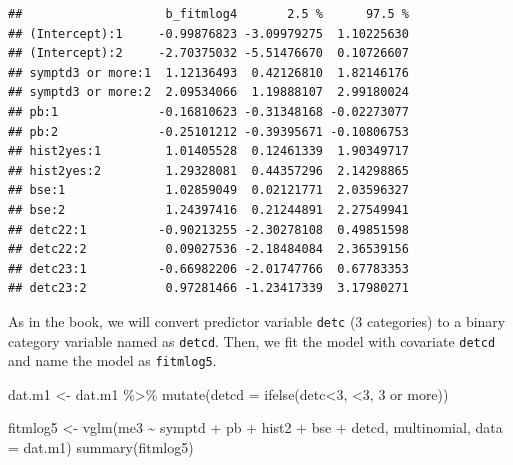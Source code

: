 \documentclass[
  10pt,
]{krantz}
\newenvironment{Shaded}{\begin{snugshade}}{\end{snugshade}}
\newcommand{\AttributeTok}[1]{\textcolor[rgb]{0.77,0.63,0.00}{#1}}
\newcommand{\DecValTok}[1]{\textcolor[rgb]{0.00,0.00,0.81}{#1}}
\newcommand{\FunctionTok}[1]{\textcolor[rgb]{0.00,0.00,0.00}{#1}}
\newcommand{\NormalTok}[1]{#1}
\newcommand{\OtherTok}[1]{\textcolor[rgb]{0.56,0.35,0.01}{#1}}
\newcommand{\SpecialCharTok}[1]{\textcolor[rgb]{0.00,0.00,0.00}{#1}}
\newcommand{\StringTok}[1]{\textcolor[rgb]{0.31,0.60,0.02}{#1}}
\begin{document}
\begin{verbatim}
##                    b_fitmlog4       2.5 %      97.5 %
## (Intercept):1     -0.99876823 -3.09979275  1.10225630
## (Intercept):2     -2.70375032 -5.51476670  0.10726607
## symptd3 or more:1  1.12136493  0.42126810  1.82146176
## symptd3 or more:2  2.09534066  1.19888107  2.99180024
## pb:1              -0.16810623 -0.31348168 -0.02273077
## pb:2              -0.25101212 -0.39395671 -0.10806753
## hist2yes:1         1.01405528  0.12461339  1.90349717
## hist2yes:2         1.29328081  0.44357296  2.14298865
## bse:1              1.02859049  0.02121771  2.03596327
## bse:2              1.24397416  0.21244891  2.27549941
## detc22:1          -0.90213255 -2.30278108  0.49851598
## detc22:2           0.09027536 -2.18484084  2.36539156
## detc23:1          -0.66982206 -2.01747766  0.67783353
## detc23:2           0.97281466 -1.23417339  3.17980271
\end{verbatim}

As in the book, we will convert predictor variable \texttt{detc} (3 categories) to a binary category variable named as \texttt{detcd}. Then, we fit the model with covariate \texttt{detcd} and name the model as \texttt{fitmlog5}.

\begin{Shaded}
\begin{Highlighting}[]
\NormalTok{dat.m1 }\OtherTok{\textless{}{-}} 
\NormalTok{  dat.m1 }\SpecialCharTok{\%\textgreater{}\%} 
  \FunctionTok{mutate}\NormalTok{(}\AttributeTok{detcd =} \FunctionTok{ifelse}\NormalTok{(detc}\SpecialCharTok{\textless{}}\DecValTok{3}\NormalTok{, }\StringTok{\textquotesingle{}\textless{}3\textquotesingle{}}\NormalTok{, }\StringTok{\textquotesingle{}3 or more\textquotesingle{}}\NormalTok{))}
\end{Highlighting}
\end{Shaded}

\begin{Shaded}
\begin{Highlighting}[]
\NormalTok{fitmlog5 }\OtherTok{\textless{}{-}} 
  \FunctionTok{vglm}\NormalTok{(me3 }\SpecialCharTok{\textasciitilde{}}\NormalTok{ symptd }\SpecialCharTok{+}\NormalTok{ pb }\SpecialCharTok{+}\NormalTok{ hist2 }\SpecialCharTok{+}\NormalTok{ bse }\SpecialCharTok{+}\NormalTok{ detcd,}
\NormalTok{                 multinomial, }\AttributeTok{data =}\NormalTok{ dat.m1)}
\FunctionTok{summary}\NormalTok{(fitmlog5)}
\end{Highlighting}
\end{Shaded}
\end{document}
